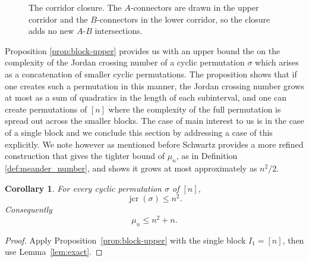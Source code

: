 \documentclass[11pt,a4paper]{amsart}
\newtheorem{corollary}[theorem]{Corollary}
\theoremstyle{definition}
\theoremstyle{remark}
\DeclareMathOperator{\jcr}{jcr}
\begin{document}
\begin{figure}[ht]
\caption{The corridor closure.  The $A$-connectors are drawn in the upper
corridor and the $B$-connectors in the lower corridor, so the closure adds
no new $A$-$B$ intersections.}
\label{fig:corridor}
\end{figure}

Proposition \ref{prop:block-upper} provides us with an upper bound the on the complexity of the Jordan crossing number of a cyclic permutation $\sigma$ which arises as a concatenation of smaller cyclic permutations.  The proposition shows that if one creates such a permutation in this manner, the Jordan crossing number grows at most as a sum of quadratics in the length of each subinterval, and one can create permutations of $[n]$ where the complexity of the full permutation is spread out across the smaller blocks.  The case of main interest to us is in the case of a single block and we conclude this section by addressing a case of this explicitly.  We note however as mentioned before Schwartz provides a more refined construction that gives the tighter bound of $\mu_{n}$, as in Definition \ref{def:meander_number}, and shows it grows at most approximately as $n^{2}/2$.  

\begin{corollary}\label{cor:global-upper}
For every cyclic permutation $\sigma$ of $[n]$,
\begin{equation*}
        \jcr(\sigma)\le n^2.
\end{equation*}
Consequently
\begin{equation*}
        \mu_{n} \le n^2+n.
\end{equation*}
\end{corollary}

\begin{proof}
Apply Proposition~\ref{prop:block-upper} with the single block $I_1=[n]$,
then use Lemma~\ref{lem:exact}.
\end{proof}
\end{document}
